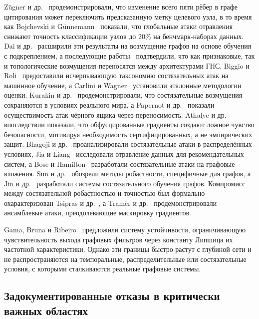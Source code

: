 Z\"{u}gner и др.~\cite{Zuegner2018} продемонстрировали, что изменение всего пяти рёбер в графе цитирования может переключить предсказанную метку целевого узла, в то время как Bojchevski и G\"{u}nnemann~\cite{Bojchevski2019} показали, что глобальные атаки отравления снижают точность классификации узлов до 20\% на бенчмарк-наборах данных. Dai и др.~\cite{Dai2018} расширили эти результаты на возмущение графов на основе обучения с подкреплением, а последующие работы~\cite{Xu2019b,Wu2019} подтвердили, что как признаковые, так и топологические возмущения переносятся между архитектурами ГНС. Biggio и Roli~\cite{Biggio2018} предоставили исчерпывающую таксономию состязательных атак на машинное обучение, а Carlini и Wagner~\cite{Carlini2017} установили эталонные методологии оценки. Kurakin и др.~\cite{Kurakin2017} продемонстрировали, что состязательные возмущения сохраняются в условиях реального мира, а Papernot и др.~\cite{Papernot2016,Papernot2017pate} показали осуществимость атак чёрного ящика через переносимость. Athalye и др.~\cite{Athalye2018} впоследствии показали, что обфусцированные градиенты создают ложное чувство безопасности, мотивируя необходимость сертифицированных, а не эмпирических защит. Bhagoji и др.~\cite{Bhagoji2019} проанализировали состязательные атаки в распределённых условиях, Jia и Liang~\cite{Jia2019} исследовали отравление данных для рекомендательных систем, а Bose и Hamilton~\cite{Bose2020} разработали состязательные атаки на графовые вложения. Sun и др.~\cite{Sun2022gnn_robustness} обозрели методы робастности, специфичные для графов, а Jin и др.~\cite{Jin2020} разработали системы состязательного обучения графов. Компромисс между состязательной робастностью и точностью был формально охарактеризован Tsipras и др.~\cite{Tsipras2019}, а Tram\`{e}r и др.~\cite{Tramer2018} продемонстрировали ансамблевые атаки, преодолевающие маскировку градиентов.

Gama, Bruna и Ribeiro~\cite{Gama2020} предложили систему устойчивости, ограничивающую чувствительность выхода графовых фильтров через константу Липшица их частотной характеристики. Однако эти границы быстро растут с глубиной сети и не распространяются на темпоральные, распределительные или состязательные условия, с которыми сталкиваются реальные графовые системы.


\subsection{Задокументированные отказы в критически важных областях}

